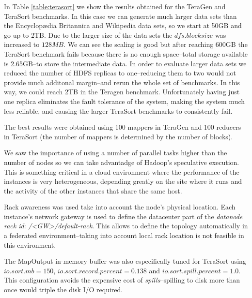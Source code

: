 

In Table \ref{table:terasort} we show the results obtained for the TeraGen and TeraSort benchmarks. In this case we can generate much larger data sets than the Encyclop{\ae}dia Britannica and Wikipedia data sets, so we start at 50GB and go up to 2TB. Due to the larger size of the data sets the $dfs.blocksize$ was increased to $128MB$. We can see the scaling is good but after reaching 600GB the TeraSort benchmark fails because there is no enough space--total storage available is 2.65GB--to store the intermediate data. In order to evaluate larger data sets we reduced the number of HDFS replicas to one--reducing them to two would not provide much additonal margin--and rerun the whole set of benchmarks. In this way, we could reach 2TB in the Teragen benchmark. Unfortunately having just one replica eliminates the fault tolerance of the system, making the system much less reliable, and causing the larger TeraSort benchmarks to consistently fail. 

The best results were obtained using 100 mappers in TeraGen and 100 reducers in TeraSort (the number of mappers is determined by the number of blocks). 

We saw the importance of using a number of parallel tasks higher than the number of nodes so we can take advantadge of Hadoop's speculative execution. This is something critical in a cloud environment where the performance of the instances is very heterogeneous, depending greatly on the site where it runs and the activity of the other instances that share the same host.

Rack awareness was used take into account the node's physical location. Each instance's network gateway is used to define the datacenter part of the \emph{datanode rack id}: \emph{/<GW>/default-rack}. This allows to define the topology automatically in a federated environment--taking into account local rack location is not feasible in this environment.

The MapOutput in-memory buffer was also especifically tuned for TeraSort using $io.sort.mb=150$, $io.sort.record.percent=0.138$ and $io.sort.spill.percent=1.0$. This configuration avoids the expensive cost of \emph{spills}--spilling to disk more than once would triple the disk I/O required. 

